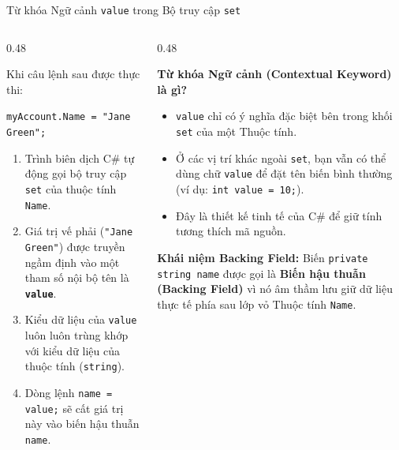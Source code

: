 \documentclass[aspectratio=169, 10pt]{beamer}
\begin{document}
\begin{frame}{Từ khóa Ngữ cảnh \texttt{value} trong Bộ truy cập \texttt{set}}
  \begin{columns}[T]
    \begin{column}{0.48\textwidth}
      \begin{tcolorbox}[colback=UniLightBlue!40,colframe=UniNavy,title=\textbf{Cơ chế Hoạt động của \texttt{value}},fonttitle=\small\bfseries]
        \small Khi câu lệnh sau được thực thi:
        \begin{center}
          \texttt{myAccount.Name = "Jane Green";}
        \end{center}
        \begin{enumerate}\small
          \item Trình biên dịch C\# tự động gọi bộ truy cập \texttt{set} của thuộc tính \texttt{Name}.
          \item Giá trị vế phải (\texttt{"Jane Green"}) được truyền ngầm định vào một tham số nội bộ tên là \textbf{\texttt{value}}.
          \item Kiểu dữ liệu của \texttt{value} luôn luôn trùng khớp với kiểu dữ liệu của thuộc tính (\texttt{string}).
          \item Dòng lệnh \texttt{name = value;} sẽ cất giá trị này vào biến hậu thuẫn \texttt{name}.
        \end{enumerate}
      \end{tcolorbox}
    \end{column}

    \begin{column}{0.48\textwidth}
      \begin{block}{\textbf{Từ khóa Ngữ cảnh (Contextual Keyword) là gì?}}
        \begin{itemize}\small
          \item \texttt{value} chỉ có ý nghĩa đặc biệt bên trong khối \texttt{set} của một Thuộc tính.
          \item Ở các vị trí khác ngoài \texttt{set}, bạn vẫn có thể dùng chữ \texttt{value} để đặt tên biến bình thường (ví dụ: \texttt{int value = 10;}).
          \item Đây là thiết kế tinh tế của C\# để giữ tính tương thích mã nguồn.
        \end{itemize}
      \end{block}
      \begin{alertblock}{\textbf{Khái niệm Backing Field:}}
        Biến \texttt{private string name} được gọi là \textbf{Biến hậu thuẫn (Backing Field)} vì nó âm thầm lưu giữ dữ liệu thực tế phía sau lớp vỏ Thuộc tính \texttt{Name}.
      \end{alertblock}
    \end{column}
  \end{columns}
\end{frame}
\end{document}
